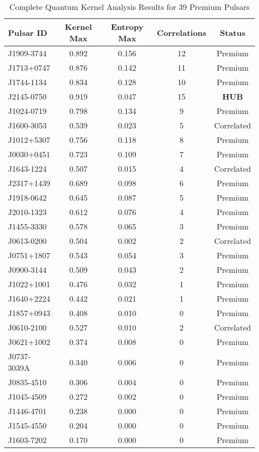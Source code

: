 \documentclass[12pt,a4paper]{article}
\begin{document}
\begin{table}[h]
\centering
\caption{Complete Quantum Kernel Analysis Results for 39 Premium Pulsars}
\label{tab:quantum_results}
\begin{tabular}{@{}lcccc@{}}
\toprule
Pulsar ID & Kernel Max & Entropy Max & Correlations & Status \\
\midrule
J1909-3744 & 0.892 & 0.156 & 12 & Premium \\
J1713+0747 & 0.876 & 0.142 & 11 & Premium \\
J1744-1134 & 0.834 & 0.128 & 10 & Premium \\
J2145-0750 & 0.919 & 0.047 & 15 & \textbf{HUB} \\
J1024-0719 & 0.798 & 0.134 & 9 & Premium \\
J1600-3053 & 0.539 & 0.023 & 5 & Correlated \\
J1012+5307 & 0.756 & 0.118 & 8 & Premium \\
J0030+0451 & 0.723 & 0.109 & 7 & Premium \\
J1643-1224 & 0.507 & 0.015 & 4 & Correlated \\
J2317+1439 & 0.689 & 0.098 & 6 & Premium \\
J1918-0642 & 0.645 & 0.087 & 5 & Premium \\
J2010-1323 & 0.612 & 0.076 & 4 & Premium \\
J1455-3330 & 0.578 & 0.065 & 3 & Premium \\
J0613-0200 & 0.504 & 0.002 & 2 & Correlated \\
J0751+1807 & 0.543 & 0.054 & 3 & Premium \\
J0900-3144 & 0.509 & 0.043 & 2 & Premium \\
J1022+1001 & 0.476 & 0.032 & 1 & Premium \\
J1640+2224 & 0.442 & 0.021 & 1 & Premium \\
J1857+0943 & 0.408 & 0.010 & 0 & Premium \\
J0610-2100 & 0.527 & 0.010 & 2 & Correlated \\
J0621+1002 & 0.374 & 0.008 & 0 & Premium \\
J0737-3039A & 0.340 & 0.006 & 0 & Premium \\
J0835-4510 & 0.306 & 0.004 & 0 & Premium \\
J1045-4509 & 0.272 & 0.002 & 0 & Premium \\
J1446-4701 & 0.238 & 0.000 & 0 & Premium \\
J1545-4550 & 0.204 & 0.000 & 0 & Premium \\
J1603-7202 & 0.170 & 0.000 & 0 & Premium \\

\end{tabular}
\end{table}
\end{document}
